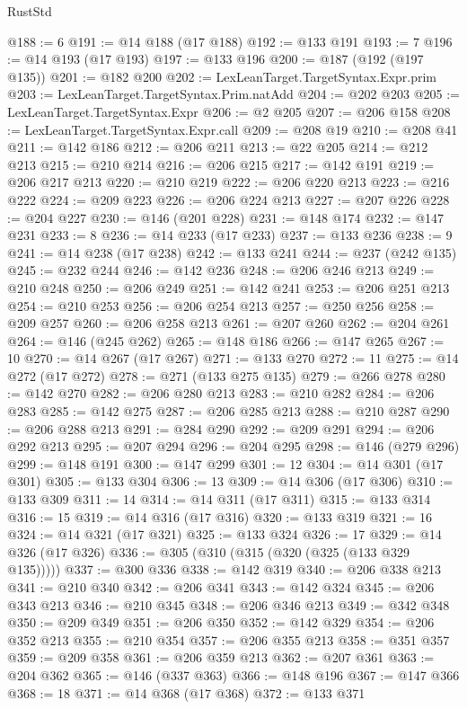 \begin{lexlean}{RustStd}
\begin{coremodule}
@188 := 6
@191 := @14 @188 (@17 @188)
@192 := @133 @191
@193 := 7
@196 := @14 @193 (@17 @193)
@197 := @133 @196
@200 := @187 (@192 (@197 @135))
@201 := @182 @200
@202 := LexLeanTarget.TargetSyntax.Expr.prim
@203 := LexLeanTarget.TargetSyntax.Prim.natAdd
@204 := @202 @203
@205 := LexLeanTarget.TargetSyntax.Expr
@206 := @2 @205
@207 := @206 @158
@208 := LexLeanTarget.TargetSyntax.Expr.call
@209 := @208 @19
@210 := @208 @41
@211 := @142 @186
@212 := @206 @211
@213 := @22 @205
@214 := @212 @213
@215 := @210 @214
@216 := @206 @215
@217 := @142 @191
@219 := @206 @217 @213
@220 := @210 @219
@222 := @206 @220 @213
@223 := @216 @222
@224 := @209 @223
@226 := @206 @224 @213
@227 := @207 @226
@228 := @204 @227
@230 := @146 (@201 @228)
@231 := @148 @174
@232 := @147 @231
@233 := 8
@236 := @14 @233 (@17 @233)
@237 := @133 @236
@238 := 9
@241 := @14 @238 (@17 @238)
@242 := @133 @241
@244 := @237 (@242 @135)
@245 := @232 @244
@246 := @142 @236
@248 := @206 @246 @213
@249 := @210 @248
@250 := @206 @249
@251 := @142 @241
@253 := @206 @251 @213
@254 := @210 @253
@256 := @206 @254 @213
@257 := @250 @256
@258 := @209 @257
@260 := @206 @258 @213
@261 := @207 @260
@262 := @204 @261
@264 := @146 (@245 @262)
@265 := @148 @186
@266 := @147 @265
@267 := 10
@270 := @14 @267 (@17 @267)
@271 := @133 @270
@272 := 11
@275 := @14 @272 (@17 @272)
@278 := @271 (@133 @275 @135)
@279 := @266 @278
@280 := @142 @270
@282 := @206 @280 @213
@283 := @210 @282
@284 := @206 @283
@285 := @142 @275
@287 := @206 @285 @213
@288 := @210 @287
@290 := @206 @288 @213
@291 := @284 @290
@292 := @209 @291
@294 := @206 @292 @213
@295 := @207 @294
@296 := @204 @295
@298 := @146 (@279 @296)
@299 := @148 @191
@300 := @147 @299
@301 := 12
@304 := @14 @301 (@17 @301)
@305 := @133 @304
@306 := 13
@309 := @14 @306 (@17 @306)
@310 := @133 @309
@311 := 14
@314 := @14 @311 (@17 @311)
@315 := @133 @314
@316 := 15
@319 := @14 @316 (@17 @316)
@320 := @133 @319
@321 := 16
@324 := @14 @321 (@17 @321)
@325 := @133 @324
@326 := 17
@329 := @14 @326 (@17 @326)
@336 := @305 (@310 (@315 (@320 (@325 (@133 @329 @135)))))
@337 := @300 @336
@338 := @142 @319
@340 := @206 @338 @213
@341 := @210 @340
@342 := @206 @341
@343 := @142 @324
@345 := @206 @343 @213
@346 := @210 @345
@348 := @206 @346 @213
@349 := @342 @348
@350 := @209 @349
@351 := @206 @350
@352 := @142 @329
@354 := @206 @352 @213
@355 := @210 @354
@357 := @206 @355 @213
@358 := @351 @357
@359 := @209 @358
@361 := @206 @359 @213
@362 := @207 @361
@363 := @204 @362
@365 := @146 (@337 @363)
@366 := @148 @196
@367 := @147 @366
@368 := 18
@371 := @14 @368 (@17 @368)
@372 := @133 @371

\end{coremodule}
\end{lexlean}
